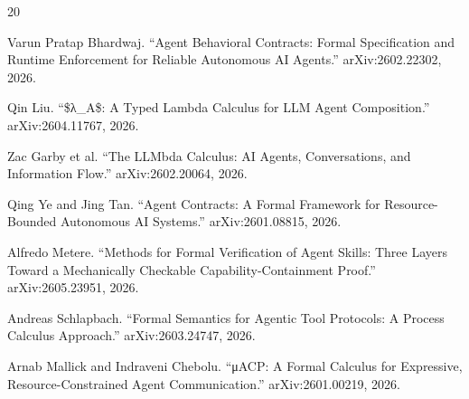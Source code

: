\begin{thebibliography}{20}

Varun Pratap Bhardwaj.
``Agent Behavioral Contracts: Formal Specification and Runtime Enforcement for Reliable Autonomous AI Agents.''
arXiv:2602.22302, 2026.

Qin Liu.
``\$λ\_A\$: A Typed Lambda Calculus for LLM Agent Composition.''
arXiv:2604.11767, 2026.

Zac Garby et al.
``The LLMbda Calculus: AI Agents, Conversations, and Information Flow.''
arXiv:2602.20064, 2026.

Qing Ye and Jing Tan.
``Agent Contracts: A Formal Framework for Resource-Bounded Autonomous AI Systems.''
arXiv:2601.08815, 2026.

Alfredo Metere.
``Methods for Formal Verification of Agent Skills: Three Layers Toward a Mechanically Checkable Capability-Containment Proof.''
arXiv:2605.23951, 2026.

Andreas Schlapbach.
``Formal Semantics for Agentic Tool Protocols: A Process Calculus Approach.''
arXiv:2603.24747, 2026.

Arnab Mallick and Indraveni Chebolu.
``μACP: A Formal Calculus for Expressive, Resource-Constrained Agent Communication.''
arXiv:2601.00219, 2026.

\end{thebibliography}
